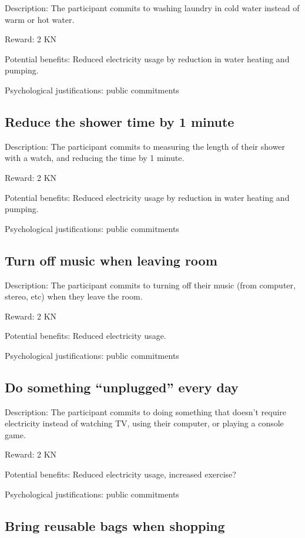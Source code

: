 Description: The participant commits to washing laundry in cold water instead of warm or hot water.

Reward: 2 KN

Potential benefits: Reduced electricity usage by reduction in water heating and pumping.

Psychological justifications: public commitments

\subsection{Reduce the shower time by 1 minute}

Description: The participant commits to measuring the length of their shower with a watch, and reducing the time by 1 minute.

Reward: 2 KN

Potential benefits: Reduced electricity usage by reduction in water heating and pumping.

Psychological justifications: public commitments

\subsection{Turn off music when leaving room}

Description: The participant commits to turning off their music (from computer, stereo, etc) when they leave the room.

Reward: 2 KN

Potential benefits: Reduced electricity usage.

Psychological justifications: public commitments

\subsection[Do something ``unplugged'' every day]{Do something ``unplugged'' every day}

Description: The participant commits to doing something that doesn't require electricity instead of watching TV, using their computer, or playing a console game.

Reward: 2 KN

Potential benefits: Reduced electricity usage, increased exercise?

Psychological justifications: public commitments

\subsection{Bring reusable bags when shopping}


